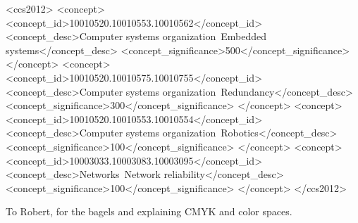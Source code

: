 \documentclass[sigconf]{acmart}
\begin{document}
\begin{CCSXML}
<ccs2012>
 <concept>
  <concept_id>10010520.10010553.10010562</concept_id>
  <concept_desc>Computer systems organization~Embedded systems</concept_desc>
  <concept_significance>500</concept_significance>
 </concept>
 <concept>
  <concept_id>10010520.10010575.10010755</concept_id>
  <concept_desc>Computer systems organization~Redundancy</concept_desc>
  <concept_significance>300</concept_significance>
 </concept>
 <concept>
  <concept_id>10010520.10010553.10010554</concept_id>
  <concept_desc>Computer systems organization~Robotics</concept_desc>
  <concept_significance>100</concept_significance>
 </concept>
 <concept>
  <concept_id>10003033.10003083.10003095</concept_id>
  <concept_desc>Networks~Network reliability</concept_desc>
  <concept_significance>100</concept_significance>
 </concept>
</ccs2012>
\end{CCSXML}






\maketitle
%
%
%






%



\begin{acks}
To Robert, for the bagels and explaining CMYK and color spaces.
\end{acks}
\end{document}
